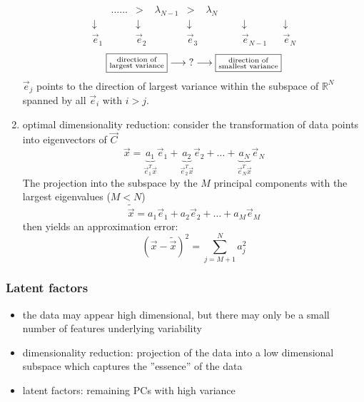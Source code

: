 \begin{enumerate}[(1)]
\begin{equation}
\begin{array}{ccccccccccc}
		& \ldots\ldots & >
		& \lambda_{N-1} & > & \lambda_N \\
		\downarrow && \downarrow && \downarrow 
		&&&& \downarrow && \downarrow \\
		\vec{e}_1 && \vec{e}_2 && \vec{e}_3 
		&&&& \vec{e}_{N-1} && \vec{e}_N
	\end{array}
\end{equation}
\[ \fbox{$ \substack{ \text{direction of} \\ \text{largest variance} } $}
	\longrightarrow \text{?} \longrightarrow 
	\fbox{$ \substack{ \text{direction of} \\ \text{smallest variance} } $}
\]
$\vec{e}_j$ points to the direction of largest variance within the 
	subspace of $\mathbb{R}^N$ spanned by all $\vec{e}_i$ with $i > j$.
      
\item optimal dimensionality reduction: consider the transformation
        of data points into eigenvectors of $\vec{C}$
\begin{equation}
	\vec{x} = \underbrace{ a_1 }_{ \vec{e}_1^T \vec{x} } \vec{e}_1
		+ \underbrace{ a_2 }_{ \vec{e}_2^T \vec{x} } \vec{e}_2
		+ \ldots
		+ \underbrace{ a_N }_{ \vec{e}_N^T \vec{x} } \vec{e}_N
\end{equation}
The projection into the subspace by the $M$ principal components with the
	largest eigenvalues ($M < N$)
\begin{equation}
	\widetilde{\vec{x}} = a_1 \vec{e}_1 + a_2 \vec{e}_2 + \ldots
		+ a_M \vec{e}_M 
\end{equation}
then yields an approximation error:
\begin{equation}
	( \vec{x} - \widetilde{\vec{x}} )^2 = \sum\limits_{j = M+1}^N a_j^2
\end{equation}
\begin{center}
\end{center}
\end{enumerate}
\subsubsection{Latent factors}
\begin{itemize}
		\item the data may appear high dimensional, but there may only be a small number of features underlying variability
		
		\item dimensionality reduction: projection of the data into a low dimensional subspace which captures the ''essence'' of the data
	
		\item latent factors: remaining PCs with high variance 
	\end{itemize}  

